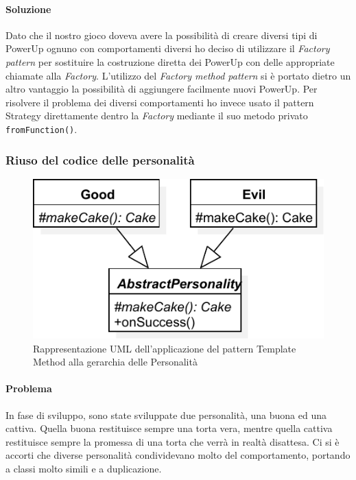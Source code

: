 \documentclass[a4paper,12pt]{report}
\begin{document}
\paragraph{Soluzione} Dato che il nostro gioco doveva avere la possibilità di creare diversi tipi di PowerUp ognuno con comportamenti diversi ho deciso di utilizzare il \textit{Factory pattern} per sostituire la costruzione diretta dei PowerUp con delle appropriate chiamate alla \textit{Factory}. L'utilizzo del \textit{Factory method pattern} si è portato dietro un altro vantaggio la possibilità di aggiungere facilmente nuovi PowerUp.
Per risolvere il problema dei diversi comportamenti ho invece usato il pattern Strategy direttamente dentro la \textit{Factory} mediante il suo metodo privato \texttt{fromFunction()}.
\subsubsection{Riuso del codice delle personalità}

\begin{figure}[H]
\centering{}
\includegraphics[width=\textwidth]{img/template}
\caption{Rappresentazione UML dell'applicazione del pattern Template Method alla gerarchia delle Personalità}
\label{img:template}
\end{figure}

\paragraph{Problema} In fase di sviluppo, sono state sviluppate due personalità, una buona ed una cattiva.
Quella buona restituisce sempre una torta vera, mentre quella cattiva restituisce sempre la
promessa di una torta che verrà in realtà disattesa.
Ci si è accorti che diverse personalità condividevano molto del comportamento,
portando a classi molto simili e a duplicazione.
\end{document}
